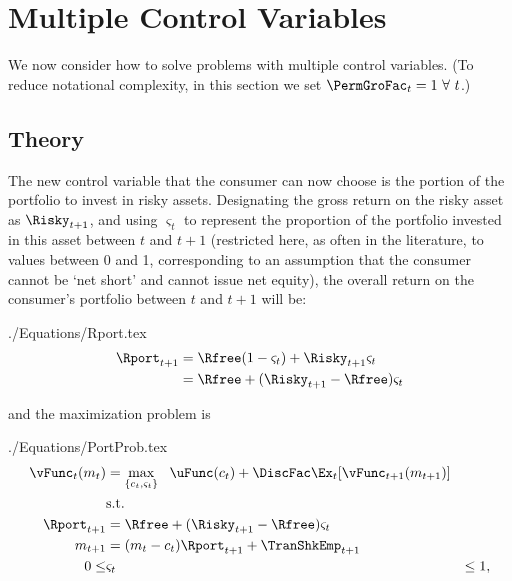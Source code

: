 \documentclass[titlepage, headings=optiontotocandhead]{\econtex}
\begin{document}
\hypertarget{Multiple-Control-Variables}{}
\section{Multiple Control Variables}

We now consider how to solve problems with multiple control variables.
(To reduce notational complexity, in this section we set $\PermGroFac_{t}=1~\forall~t$.)

\subsection{Theory}
The new control variable that the consumer can now choose
is the portion of the portfolio to invest in risky assets.
Designating the gross return on the risky asset
as $\Risky_{t+1}$, and using $\varsigma_{t}$ to represent the
proportion of the portfolio invested in this asset between $t$ and $t+1$
(restricted here, as often in the literature, to values between 0 and
1, corresponding to an assumption that the consumer cannot be `net
short' and cannot issue net equity), the overall return on
the consumer's portfolio between $t$ and $t+1$ will be:
\begin{verbatimwrite}{./Equations/Rport.tex}
  \begin{equation}\begin{gathered}\begin{aligned}
        \Rport_{t+1}  & = \Rfree(1-\varsigma_{t}) + \Risky_{t+1}\varsigma_{t} \label{eq:return1}
        \\               & = \Rfree + (\Risky_{t+1}-\Rfree) \varsigma_{t} %
      \end{aligned}\end{gathered}\end{equation}
\end{verbatimwrite}
\unskip
and the maximization problem is
\begin{verbatimwrite}{./Equations/PortProb.tex}
  \begin{equation*}\begin{gathered}\begin{aligned}
        {\vFunc}_{t}({m}_{t})  & = \max_{\{{c}_{t},\varsigma_{t}\}}   ~~ \uFunc({c}_{t}) +  \DiscFac
        \Ex_{t}[{\vFunc}_{t+1}({m}_{t+1})]
        \\      & \text{s.t.} & \nonumber
        \\      \Rport_{t+1}  & = \Rfree + (\Risky_{t+1}-\Rfree) \varsigma_{t}
        \\      {m}_{t+1}  & = ({m}_{t}-{c}_{t})\Rport_{t+1} + \TranShkEmp_{t+1}
        \\  0       \leq & \varsigma_{t} & \leq 1, \label{eq:noshorts}
      \end{aligned}\end{gathered}\end{equation*}
\end{verbatimwrite}
\end{document}
